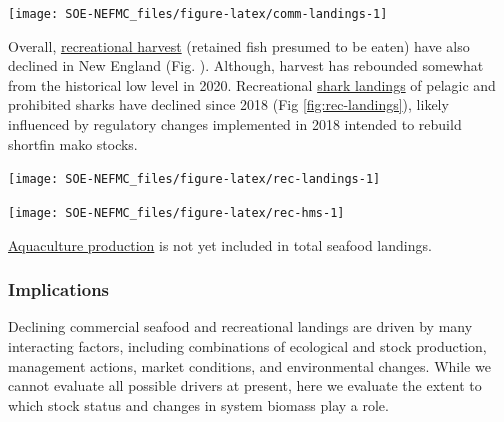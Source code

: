 \documentclass[
  10pt,
]{article}
\let\origfigure\figure
\let\endorigfigure\endfigure
\renewenvironment{figure}[1][2] {
    \expandafter\origfigure\expandafter[H]
} {
    \endorigfigure
}
\begin{document}
\begin{figure}

{\centering \texttt{[image: SOE-NEFMC\_files/figure-latex/comm-landings-1]} 

}

\caption{Total commercial landings (black) and NEFMC managed U.S seafood landings (red) by feeding guild for the Gulf of Maine.}\label{fig:comm-landings}
\end{figure}

Overall, \href{https://noaa-edab.github.io/catalog/recreational-fishing-indicators.html}{recreational harvest} (retained fish presumed to be eaten) have also declined in New England (Fig. ). Although, harvest has rebounded somewhat from the historical low level in 2020. Recreational \href{https://noaa-edab.github.io/catalog/highly-migratory-species-landings.html}{shark landings} of pelagic and prohibited sharks have declined since 2018 (Fig \ref{fig:rec-landings}), likely influenced by regulatory changes implemented in 2018 intended to rebuild shortfin mako stocks.

\begin{figure}

{\centering \texttt{[image: SOE-NEFMC\_files/figure-latex/rec-landings-1]} 

}

\caption{Total recreational seafood harvest (millions of pounds) in the New England region.}\label{fig:rec-landings}
\end{figure}

\begin{figure}

{\centering \texttt{[image: SOE-NEFMC\_files/figure-latex/rec-hms-1]} 

}

\caption{Recreational shark landings from Large Pelagics Survey.}\label{fig:rec-hms}
\end{figure}

\href{https://noaa-edab.github.io/catalog/aquaculture-production.html}{Aquaculture production} is not yet included in total seafood landings.

\hypertarget{implications}{%
\subsubsection{Implications}\label{implications}}

Declining commercial seafood and recreational landings are driven by many interacting factors, including combinations of ecological and stock production, management actions, market conditions, and environmental changes. While we cannot evaluate all possible drivers at present, here we evaluate the extent to which stock status and changes in system biomass play a role.
\end{document}
